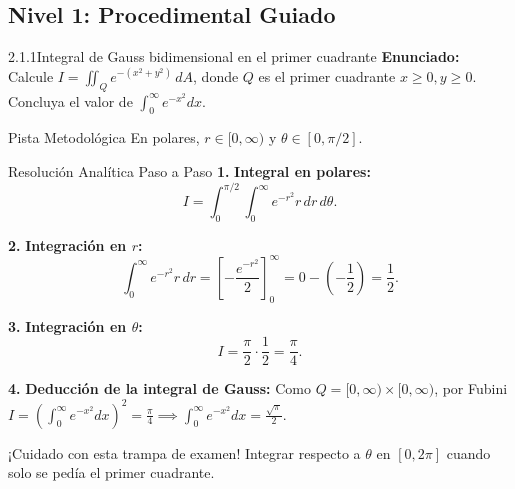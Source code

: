 \documentclass[11pt,a4paper]{article}
\begin{document}
\subsection{Nivel 1: Procedimental Guiado}

\begin{nivelbox}{2.1.1}{Integral de Gauss bidimensional en el primer cuadrante}
\textbf{Enunciado:}\\
Calcule $I = \iint_Q e^{-(x^2 + y^2)} \, dA$, donde $Q$ es el primer cuadrante $x \ge 0, y \ge 0$. Concluya el valor de $\int_0^\infty e^{-x^2} dx$.

\begin{observacionbox}{Pista Metodológica}
En polares, $r \in [0, \infty)$ y $\theta \in [0, \pi/2]$.
\end{observacionbox}

\begin{ejerciciobox}{Resolución Analítica Paso a Paso}
\smallskip\noindent\textbf{1.} \textbf{Integral en polares:}
\[I = \int_0^{\pi/2} \int_0^\infty e^{-r^2} r \, dr \, d\theta.\]

\smallskip\noindent\textbf{2.} \textbf{Integración en $r$:}
\[\int_0^\infty e^{-r^2} r \, dr = \left[ -\frac{e^{-r^2}}{2} \right]_0^\infty = 0 - \left(-\frac{1}{2}\right) = \frac{1}{2}.\]

\smallskip\noindent\textbf{3.} \textbf{Integración en $\theta$:}
\[I = \frac{\pi}{2} \cdot \frac{1}{2} = \frac{\pi}{4}.\]

\smallskip\noindent\textbf{4.} \textbf{Deducción de la integral de Gauss:}
Como $Q = [0, \infty) \times [0, \infty)$, por Fubini $I = \left( \int_0^\infty e^{-x^2} dx \right)^2 = \frac{\pi}{4} \implies \int_0^\infty e^{-x^2} dx = \frac{\sqrt{\pi}}{2}$.
\end{ejerciciobox}

\begin{errorbox}{¡Cuidado con esta trampa de examen!}
Integrar respecto a $\theta$ en $[0, 2\pi]$ cuando solo se pedía el primer cuadrante.
\end{errorbox}
\end{nivelbox}
\bigskip
\end{document}
